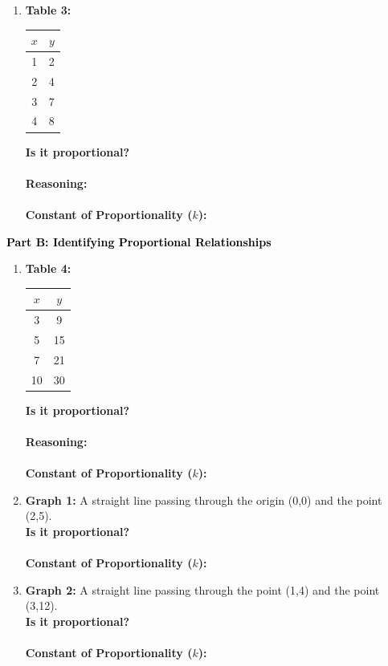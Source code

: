 \documentclass[12pt, letterpaper, fleqn]{article}
\newcommand{\blank}{\underline{\hspace{2.2cm}}}
\newcommand{\blanklong}{\underline{\hspace{6.5cm}}}
\begin{document}
\begin{enumerate}[itemsep=4.2cm, leftmargin=0.6cm]
\newpage
\item \textbf{Table 3:}
\begin{center}
\begin{tabular}{|c|c|}
\hline
$x$ & $y$ \\
\hline
1 & 2 \\
2 & 4 \\
3 & 7 \\
4 & 8 \\
\hline
\end{tabular}
\end{center}
\textbf{Is it proportional?} \blank \\ \\
\textbf{Reasoning:} \blanklong \\ \\
\textbf{Constant of Proportionality ($k$):} \blank

\vspace{2cm}
\end{enumerate}

\newpage

\begin{tcolorbox}[colback=customteal!20]
\large\textcolor{black}{\textbf{Part B: Identifying Proportional Relationships}}
\end{tcolorbox}

\vspace{3mm}

\begin{enumerate}[itemsep=4.2cm, leftmargin=0.6cm, resume]
\item \textbf{Table 4:}
\begin{center}
\begin{tabular}{|c|c|}
\hline
$x$ & $y$ \\
\hline
3 & 9 \\
5 & 15 \\
7 & 21 \\
10 & 30 \\
\hline
\end{tabular}
\end{center}
\textbf{Is it proportional?} \blank \\ \\
\textbf{Reasoning:} \blanklong \\ \\
\textbf{Constant of Proportionality ($k$):} \blank
\item \textbf{Graph 1:} A straight line passing through the origin (0,0) and the point (2,5). \\
\textbf{Is it proportional?} \blank \\ \\
\textbf{Constant of Proportionality ($k$):} \blank
\item \textbf{Graph 2:} A straight line passing through the point (1,4) and the point (3,12). \\
\textbf{Is it proportional?} \blank \\ \\
\textbf{Constant of Proportionality ($k$):} \blank
\end{enumerate}
\end{document}
